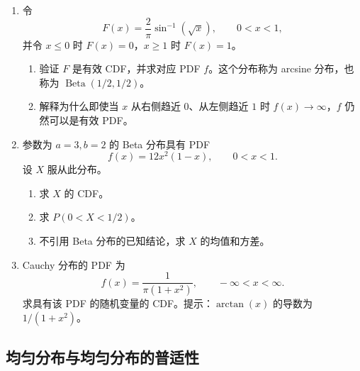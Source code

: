 \documentclass[UTF8,12pt,a4paper,fontset=fandol]{ctexart}
\begin{document}
\begin{enumerate}
  \item 令
  \[
    F(x)=\frac{2}{\pi}\sin^{-1}(\sqrt{x}),\qquad 0<x<1,
  \]
  并令 $x\le0$ 时 $F(x)=0$，$x\ge1$ 时 $F(x)=1$。
  \begin{enumerate}
    \item 验证 $F$ 是有效 CDF，并求对应 PDF $f$。这个分布称为 arcsine 分布，也称为 $\operatorname{Beta}(1/2,1/2)$。
    \item 解释为什么即使当 $x$ 从右侧趋近 $0$、从左侧趋近 $1$ 时 $f(x)\to\infty$，$f$ 仍然可以是有效 PDF。
  \end{enumerate}

  \item 参数为 $a=3,b=2$ 的 Beta 分布具有 PDF
  \[
    f(x)=12x^2(1-x),\qquad 0<x<1.
  \]
  设 $X$ 服从此分布。
  \begin{enumerate}
    \item 求 $X$ 的 CDF。
    \item 求 $P(0<X<1/2)$。
    \item 不引用 Beta 分布的已知结论，求 $X$ 的均值和方差。
  \end{enumerate}

  \item Cauchy 分布的 PDF 为
  \[
    f(x)=\frac{1}{\pi(1+x^2)},\qquad -\infty<x<\infty.
  \]
  求具有该 PDF 的随机变量的 CDF。提示：$\arctan(x)$ 的导数为 $1/(1+x^2)$。
\end{enumerate}

\subsection*{均匀分布与均匀分布的普适性}
\end{document}

